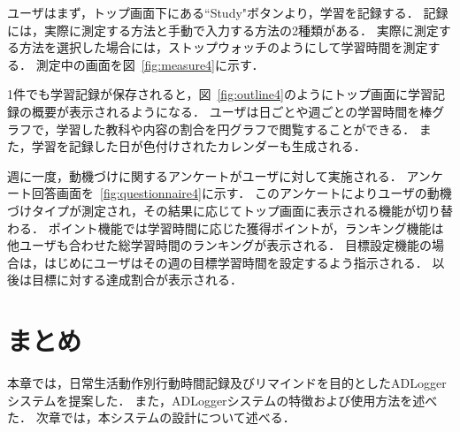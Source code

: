 ユーザはまず，トップ画面下にある``Study"ボタンより，学習を記録する．
記録には，実際に測定する方法と手動で入力する方法の2種類がある．
実際に測定する方法を選択した場合には，ストップウォッチのようにして学習時間を測定する．
測定中の画面を図~\ref{fig:measure4}に示す．

1件でも学習記録が保存されると，図~\ref{fig:outline4}のようにトップ画面に学習記録の概要が表示されるようになる．
ユーザは日ごとや週ごとの学習時間を棒グラフで，学習した教科や内容の割合を円グラフで閲覧することができる．
また，学習を記録した日が色付けされたカレンダーも生成される．

週に一度，動機づけに関するアンケートがユーザに対して実施される．
アンケート回答画面を~\ref{fig:questionnaire4}に示す．
このアンケートによりユーザの動機づけタイプが測定され，その結果に応じてトップ画面に表示される機能が切り替わる．
ポイント機能では学習時間に応じた獲得ポイントが，ランキング機能は他ユーザも合わせた総学習時間のランキングが表示される．
目標設定機能の場合は，はじめにユーザはその週の目標学習時間を設定するよう指示される．
以後は目標に対する達成割合が表示される．
\section{まとめ}
本章では，日常生活動作別行動時間記録及びリマインドを目的としたADLoggerシステムを提案した．
また，ADLoggerシステムの特徴および使用方法を述べた．
次章では，本システムの設計について述べる．
